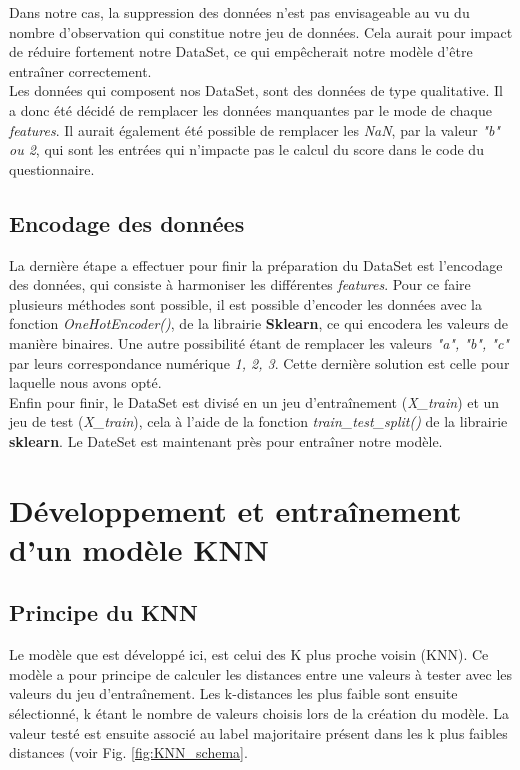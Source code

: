 \documentclass[french]{article}
\begin{document}
Dans notre cas, la suppression des données n'est pas envisageable au vu du nombre d'observation qui constitue notre jeu de données. Cela aurait pour impact de réduire fortement notre DataSet, ce qui empêcherait notre modèle d'être entraîner correctement.\\

\noindent Les données qui composent nos DataSet, sont des données de type qualitative. Il a donc été décidé de remplacer les données manquantes par le mode de chaque \textit{features}. Il aurait également été possible de remplacer les \textit{NaN}, par la valeur \textit{"b" ou 2}, qui sont les entrées qui n'impacte pas le calcul du score dans le code du questionnaire.

\subsection{Encodage des données}

La dernière étape a effectuer pour finir la préparation du DataSet est l'encodage des données, qui consiste à harmoniser les différentes \textit{features}. Pour ce faire plusieurs méthodes sont possible, il est possible d'encoder les données avec la fonction \textit{OneHotEncoder()}, de la librairie \textbf{Sklearn}, ce qui encodera les valeurs de manière binaires. Une autre possibilité étant de remplacer les valeurs \textit{"a", "b", "c"} par leurs correspondance numérique \textit{1, 2, 3}. Cette dernière solution est celle pour laquelle nous avons opté.\\

\noindent Enfin pour finir, le DataSet est divisé en un jeu d'entraînement (\textit{X\_train}) et un jeu de test (\textit{X\_train}), cela à l'aide de la fonction \textit{train\_test\_split()} de la librairie \textbf{sklearn}. Le DateSet est maintenant près pour entraîner notre modèle.

\section{Développement et entraînement d'un modèle KNN}

\subsection{Principe du KNN}

Le modèle que est développé ici, est celui des K plus proche voisin (KNN). Ce modèle a pour principe de calculer les distances entre une valeurs à tester avec les valeurs du jeu d'entraînement. Les k-distances les plus faible sont ensuite sélectionné, k étant le nombre de valeurs choisis lors de la création du modèle. La valeur testé est ensuite associé au label majoritaire présent dans les k plus faibles distances (voir Fig. \ref{fig:KNN_schema}.\\
\end{document}
